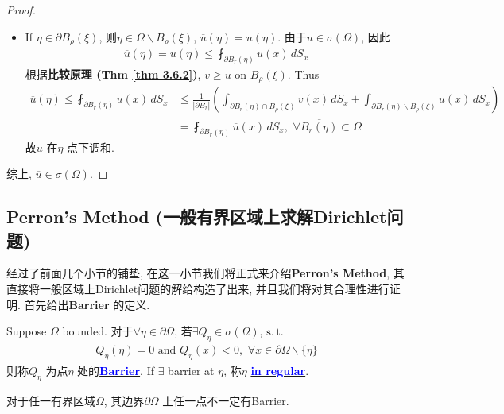 \begin{thm}
\begin{proof}
\begin{itemize}
				\vspace*{3em}
				
				\item If $\eta \in \partial B_{\rho}(\xi)$, 则$\eta \in \Omega \backslash B_{\rho}(\xi)$, $\overline{u}(\eta) = u(\eta)$. 由于$u \in \sigma(\Omega)$, 因此
				\begin{align*}
					\overline{u}(\eta) 
					= u(\eta) 
					\leq \fint_{\partial B_{r}(\eta)} u(x) \, dS_x 
				\end{align*}
				根据\textbf{比较原理 (Thm \ref{thm 3.6.2})}, $v \geq u$ on $\overline{B_{\rho}(\xi)}$. Thus
				\begin{align*}
					\overline{u}(\eta) 
					\leq \fint_{\partial B_{r}(\eta)} u(x) \, dS_x 
					&\leq \frac{1}{| \partial B_r |} \left( \int_{\partial B_r(\eta) \cap B_\rho (\xi)} v(x) \, dS_x + \int_{\partial B_{r}(\eta) \backslash B_{\rho}(\xi)} u(x) \, dS_x \right) \\
					&= \fint_{\partial B_{r}(\eta)} \overline{u}(x) \, dS_x , \,\, \forall \overline{B_{r}(\eta)} \subset \Omega
				\end{align*}
				故$\overline{u}$ 在$\eta$ 点下调和. 
			\end{itemize}
			综上, $\overline{u} \in \sigma(\Omega)$. 
		\end{proof}
	\end{thm}

\newpage

\subsection{Perron's Method (一般有界区域上求解Dirichlet问题)}
	经过了前面几个小节的铺垫, 在这一小节我们将正式来介绍\textbf{Perron's Method}, 其直接将一般区域上Dirichlet问题的解给构造了出来, 并且我们将对其合理性进行证明. 首先给出\textbf{Barrier} 的定义. 
	
	\vspace*{1em}
	
	\begin{defn}\label{def 3.6.2}
		Suppose $\Omega$ bounded. 对于$\forall \eta \in \partial \Omega$, 若$\exists Q_\eta \in \sigma(\Omega)$, $\operatorname{s.t.}$ 
		\begin{align*}
			Q_\eta(\eta) = 0 \,\, \text{and} \,\, Q_\eta(x) < 0 , \,\, \forall x \in \partial \Omega \backslash \{ \eta \}
		\end{align*}
		则称$Q_\eta$ 为点$\eta$ 处的\underline{\textcolor{blue}{\textbf{Barrier}}}. If $\exists$ barrier at $\eta$, 称$\eta$ \underline{\textcolor{blue}{\textbf{in regular}}}. 
		
		\vspace*{2em}
		
		\begin{rmk}
			对于任一有界区域$\Omega$, 其边界$\partial \Omega$ 上任一点不一定有Barrier. 
		\end{rmk}
	\end{defn}
	
